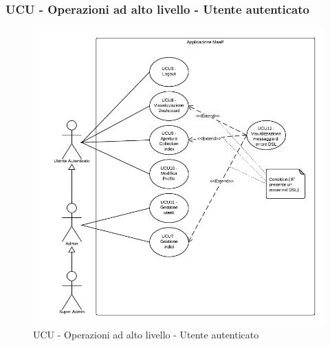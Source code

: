 \subsubsection{UCU - Operazioni ad alto livello - Utente autenticato}    
    \begin{figure}[H]
      \begin{center}
      \includegraphics[scale=0.16]{UML/UCU - Operazioni ad alto livello - Utente autenticato.png}
      \caption{UCU - Operazioni ad alto livello - Utente autenticato}
      \end{center} 
    \end{figure}    
    
